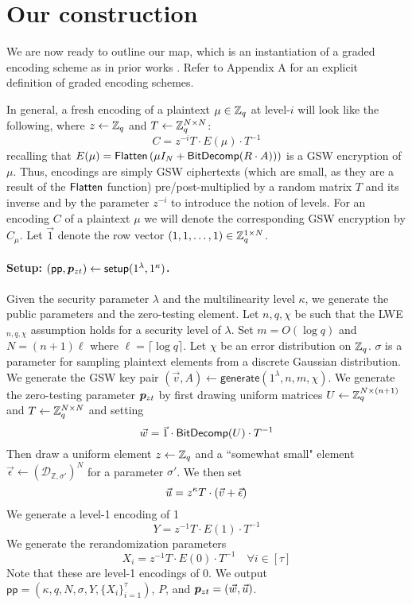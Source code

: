 \section{Our construction}

We are now ready to outline our map, which is an instantiation of a graded encoding scheme as in prior works \cite{clt, ggh13a, clt15}.  Refer to Appendix A for an explicit definition of graded encoding schemes. 

In general, a fresh encoding of a plaintext $\mu \in \mathbb{Z}_q$ at level-$i$ will look like the following, where $z \leftarrow \mathbb{Z}_q$ and $T\leftarrow \mathbb{Z}_q^{N \times N}$:
$$C = z^{-i}T \cdot E(\mu)\cdot T^{-1}$$
recalling that $E(\mu) = \mathsf{Flatten}\left(\mu I_{N} + \mathsf{BitDecomp}(R\cdot A))\right)$ is a GSW encryption of $\mu$. Thus, encodings are simply GSW ciphertexts (which are small, as they are a result of the $\mathsf{Flatten}$ function) pre/post-multiplied by a random matrix $T$ and its inverse and by the parameter $z^{-i}$ to introduce the notion of levels.  For an encoding $C$ of a plaintext $\mu$ we will denote the corresponding GSW encryption by $C_\mu$.  Let $\vec{1}$ denote the row vector $(1,1,\ldots, 1) \in \mathbb{Z}_q^{1 \times N}$.

\paragraph{Setup: $(\mathsf{pp},\bm{p}_{zt}) \leftarrow \mathsf{setup}(1^\lambda, 1^\kappa)$.}  Given the security parameter $\lambda$ and the multilinearity level $\kappa$, we generate the public parameters and the zero-testing element.  Let $n,q, \chi$ be such that the LWE$_{n,q,\chi}$ assumption holds for a security level of $\lambda$.  Set $m = O(\log q)$ and $N = (n+1)\ell$ where $\ell = \lceil \log q \rceil$.  Let $\chi$ be an error distribution on $\mathbb{Z}_q$.  $\sigma$ is a parameter for sampling plaintext elements from a discrete Gaussian distribution.  We generate the GSW key pair $(\vec{v},A) \leftarrow \mathsf{generate}(1^\lambda,n,m, \chi)$.  We generate the zero-testing parameter $\bm{p}_{zt}$ by first drawing uniform matrices $U \leftarrow \mathbb{Z}_q^{N\times (n+1)}$ and $T \leftarrow \mathbb{Z}_q^{N \times N}$ and setting $$\vec{w} = \vec{1}\cdot \mathsf{BitDecomp}(U)\cdot T^{-1}$$  Then draw a uniform element $z \leftarrow \mathbb{Z}_q$ and a ``somewhat small" element $\vec{\epsilon} \leftarrow (\mathcal{D}_{\mathbb{Z}, \sigma'})^N$ for a parameter $\sigma'$.  We then set $$\vec{u} = z^\kappa T\cdot (\vec{v} + \vec{\epsilon})$$  We generate a level-1 encoding of 1 $$Y = z^{-1}T\cdot E(1) \cdot T^{-1}$$  We generate the rerandomization parameters $$X_i = z^{-1}T\cdot E(0) \cdot T^{-1} \quad \forall i \in [\tau]$$  Note that these are level-1 encodings of 0. We output $\mathsf{pp} = (\kappa, q,N,\sigma, Y, \{X_i\}_{i=1}^\tau)$, $P$, and $\bm{p}_{zt} = (\vec{w},\vec{u})$.

